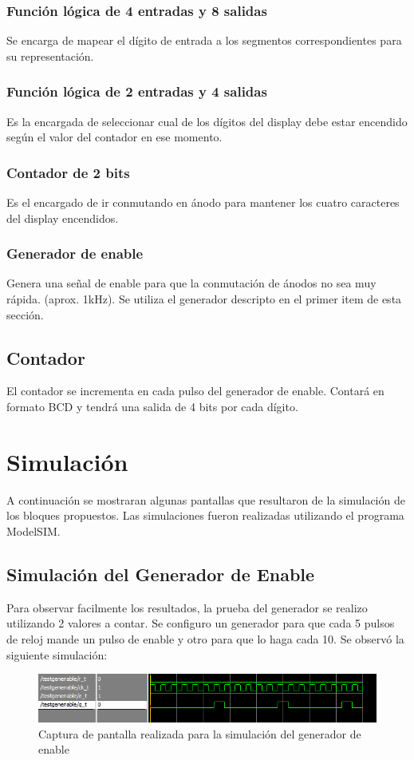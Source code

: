 \documentclass[a4paper,10pt]{article}
\begin{document}
		\subsubsection{Función lógica de 4 entradas y 8 salidas}
		Se encarga de mapear el dígito de entrada a los segmentos correspondientes para su representación.
		\subsubsection{Función lógica de 2 entradas y 4 salidas}
		Es la encargada de seleccionar cual de los dígitos del display debe estar encendido según el valor del contador en ese momento. 
		\subsubsection{Contador de 2 bits}
		Es el encargado de ir conmutando en ánodo para mantener los cuatro caracteres del display encendidos.					\subsubsection{Generador de enable}
		Genera una señal de enable para que la conmutación de ánodos no sea muy rápida. (aprox. 1kHz). Se utiliza el generador descripto en el primer item de esta sección.
	\subsection{Contador}
	El contador se incrementa en cada pulso del generador de enable. Contará en formato BCD y tendrá una salida de 4 bits por cada dígito.

\section{Simulación}
A continuación se mostraran algunas pantallas que resultaron de la simulación de los bloques propuestos. Las simulaciones fueron realizadas utilizando el programa ModelSIM.
	\subsection{Simulación del Generador de Enable}
	Para observar facilmente los resultados, la prueba del generador se realizo utilizando 2 valores a contar. Se configuro un generador para que cada 5 pulsos de reloj mande un pulso de enable y otro para que lo haga cada 10.
	Se observó la siguiente simulación:
	 \begin{figure}[H]
		\centering
		\includegraphics[scale=0.5]{sim-genen.png}
		\caption{Captura de pantalla realizada para la simulación del generador de enable}
		\label{fig:diag_contr}
	\end{figure}
		
\end{document}
